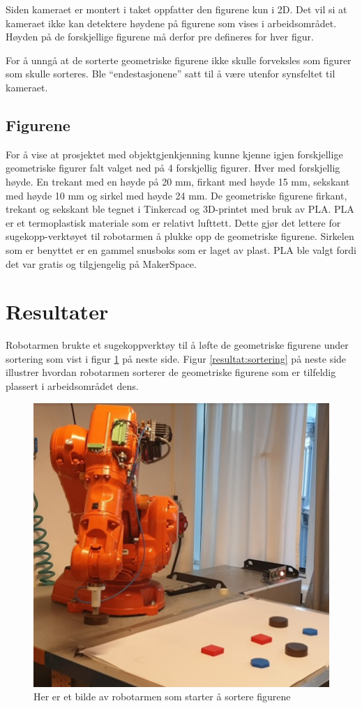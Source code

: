 \documentclass[conference]{IEEEtran}
\begin{document}
        Siden kameraet er montert i taket oppfatter den figurene kun i 2D. Det vil si at kameraet ikke kan detektere høydene på figurene som vises i arbeidsområdet. Høyden på de forskjellige figurene må derfor pre defineres for hver figur. 

        For å unngå at de sorterte geometriske figurene ikke skulle forveksles som figurer som skulle sorteres. Ble “endestasjonene” satt til å være utenfor synsfeltet til kameraet.

    \subsection{Figurene}
        For å vise at prosjektet med objektgjenkjenning kunne kjenne igjen forskjellige geometriske figurer falt valget ned på 4 forskjellig figurer. Hver med forskjellig høyde. En trekant med en høyde på 20 mm, firkant med høyde 15 mm, sekskant med høyde 10 mm og sirkel med høyde 24 mm. 
        De geometriske figurene firkant, trekant og sekskant ble tegnet i Tinkercad \cite{metode:tinkercad} og 3D-printet med bruk av PLA. PLA er et termoplastisk materiale som er relativt lufttett. Dette gjør det lettere for sugekopp-verktøyet til robotarmen å plukke opp de geometriske figurene. Sirkelen som er benyttet er en gammel snusboks som er laget av plast. PLA ble valgt fordi det var gratis og tilgjengelig på MakerSpace.

        
\section{Resultater}
    Robotarmen brukte et sugekoppverktøy til å løfte de geometriske figurene under sortering som vist i figur \ref{resultat:robotarm} på neste side. 
    Figur \ref{resultat:sortering} på neste side illustrer hvordan robotarmen sorterer de geometriske figurene som er tilfeldig plassert i arbeidsområdet dens.
    \begin{figure}[!htb]
        \centering
        \includegraphics[width=.8\linewidth]{images/robotarm1.png}
        \caption{Her er et bilde av robotarmen som starter å sortere figurene}
        \label{resultat:robotarm}
    \end{figure}
\end{document}
